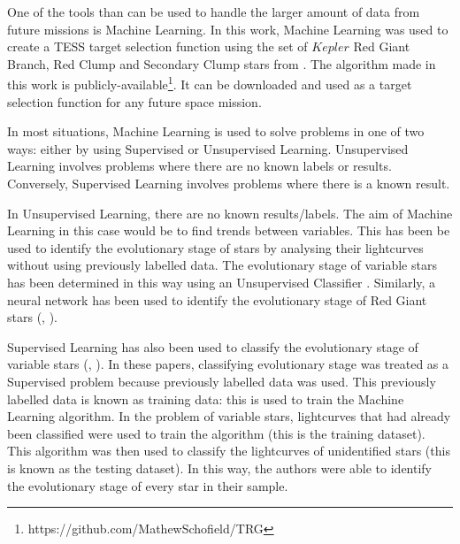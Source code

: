 \documentclass[a4paper,fleqn,usenatbib,useAMS]{mnras}
\newcommand{\msol}{\ensuremath{M_{\odot}\:}}
\begin{document}
One of the tools than can be used to handle the larger amount of data from future missions is Machine Learning. In this work, Machine Learning was used to create a TESS target selection function using the set of $Kepler$ Red Giant Branch, Red Clump and Secondary Clump stars from \citet{davies_asteroseismology_2016}. The algorithm made in this work is publicly-available\footnote{https://github.com/MathewSchofield/TRG}. It can be downloaded and used as a target selection function for any future space mission.


In most situations, Machine Learning is used to solve problems in one of two ways: either by using Supervised or Unsupervised Learning. Unsupervised Learning involves problems where there are no known labels or results. Conversely, Supervised Learning involves problems where there is a known result.

In Unsupervised Learning, there are no known results/labels. The aim of Machine Learning in this case would be to find trends between variables. This has been be used to identify the evolutionary stage of stars by analysing their lightcurves without using previously labelled data. The evolutionary stage of variable stars has been determined in this way using an Unsupervised Classifier \citep{valenzuela_unsupervised_2018}. Similarly, a neural network has been used to identify the evolutionary stage of Red Giant stars (\citet{hon_deep_2017}, \citet{hon_deep_2018}).

Supervised Learning has also been used to classify the evolutionary stage of variable stars (\citet{nun_supervised_2014}, \citet{elorrieta_machine_2016}). In these papers, classifying evolutionary stage was treated as a Supervised problem because previously labelled data was used. This previously labelled data is known as training data: this is used to train the Machine Learning algorithm. In the problem of variable stars, lightcurves that had already been classified were used to train the algorithm (this is the training dataset). This algorithm was then used to classify the lightcurves of unidentified stars (this is known as the testing dataset). In this way, the authors were able to identify the evolutionary stage of every star in their sample.
\end{document}
